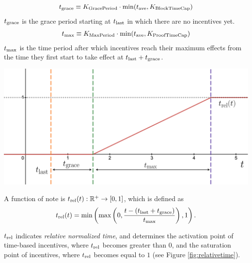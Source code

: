 \documentclass[9pt,oneside]{amsart}
\newenvironment{Figure}
  {\par\medskip\noindent\minipage{\linewidth}}
  {\endminipage\par\medskip}
\begin{document}
\begin{multicols}{2}
\begin{align}
t_\textnormal{grace}  \equiv  K_\textnormal{GracePeriod} \cdot \min(t_\textnormal{ave}, K_\textnormal{BlockTimeCap})
\end{align}
$t_\textnormal{grace}$ is the grace period starting at $t_\textnormal{last}$ in which there are no incentives yet.
\begin{align}
t_\textnormal{max}  \equiv   K_{\mathrm{MaxPeriod}} \cdot \min(t_\textnormal{ave}, K_\textnormal{ProofTimeCap}) 
\end{align}
$t_\textnormal{max}$ is the time period after which incentives reach their maximum effects from the time they first start to take effect at $t_\textnormal{last}+t_\textnormal{grace}$. 
\begin{Figure}
 \centering
\includegraphics[width=\linewidth]{fig/relative_time_graph.png}
 \vspace{-0.2in}
\label{fig:relativetime}
\end{Figure}

A function of note is $t_\textnormal{rel}(t): \mathbb{R}^+ \rightarrow [0,1]$, which is defined as
\begin{align}
t_\textnormal{rel} (t) =  
\textnormal{min}\left(\textnormal{max}\left(0, \frac{t - (t_\textnormal{last} + t_\textnormal{grace})}{t_\textnormal{max}}\right), 1\right).
\end{align}

$t_\textnormal{rel}$ indicates \emph{relative normalized time}, and determines the activation point of time-based incentives, where $t_\textnormal{rel}$ becomes greater than $0$, and the saturation point of incentives, where $t_\textnormal{rel}$ becomes equal to $1$ (see Figure \ref{fig:relativetime}).




\end{multicols}
\end{document}
